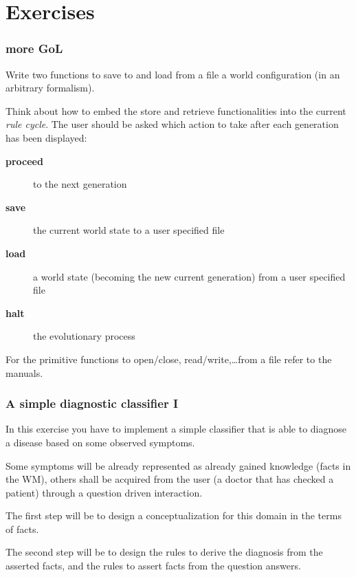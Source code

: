 \documentclass[xcolor={usenames,dvipsnames,svgnames}, compress]{beamer}
\begin{document}
\section{Exercises}
{
  \begin{frame}
    \sectionpage
  \end{frame}
}

\begin{frame}
  \frametitle{more GoL}
  Write two functions to save to and load from a file a world
  configuration (in an arbitrary formalism).\par\bigskip

  Think about how to embed the store and retrieve functionalities into
  the current \emph{rule cycle}.
  The user should be asked which action to take after each
  generation has been displayed:
  \begin{description}
  \item[\textbf{proceed}] to the next generation
  \item[\textbf{save}] the current world state to a user specified file
  \item[\textbf{load}] a world state (becoming the new current generation) from a user specified file
  \item[\textbf{halt}] the evolutionary process
  \end{description}\bigskip

  For the primitive functions to \textsf{open/close}, \textsf{read/write},\dots from a
  file refer to the manuals.
\end{frame}

\begin{frame}
  \frametitle{A simple diagnostic classifier I}
  In this exercise you have to implement a simple classifier that is
  able to diagnose a disease based on some observed
  symptoms.\par\bigskip

  Some symptoms will be already represented as already gained
  knowledge (facts in the WM), others shall be acquired from the user
  (a doctor that has checked a patient) through a question driven interaction.\par\bigskip

  The first step will be to design a conceptualization for this domain
  in the terms of facts.\par\bigskip

  The second step will be to design the rules to derive the diagnosis
  from the asserted facts, and the rules to assert facts from the
  question answers.

  
\end{frame}
\end{document}
